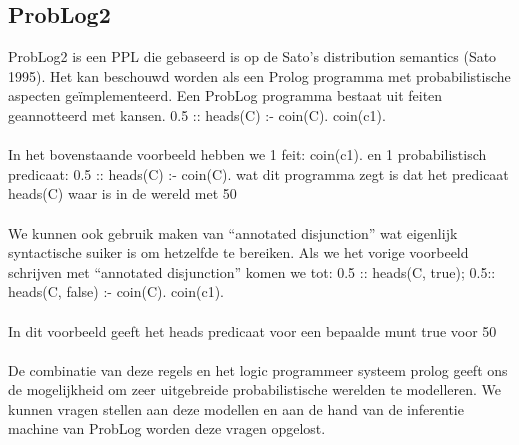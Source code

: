 \documentclass[12pt,a4paper,oneside]{book}
\begin{document}
\subsection{ProbLog2}
ProbLog2 is een PPL die gebaseerd is op de Sato’s distribution semantics (Sato 1995). Het kan beschouwd worden als een Prolog programma met probabilistische aspecten geïmplementeerd. Een ProbLog programma bestaat uit feiten geannotteerd met kansen.
0.5 :: heads(C) :- coin(C).
coin(c1).
\\\\
In het bovenstaande voorbeeld hebben we 1 feit: coin(c1). en 1 probabilistisch predicaat: 0.5 :: heads(C) :- coin(C). wat dit programma zegt is dat het predicaat heads(C) waar is in de wereld met 50%
\\\\
We kunnen ook gebruik maken van “annotated disjunction” wat eigenlijk syntactische suiker is om hetzelfde te bereiken. Als we het vorige voorbeeld schrijven met “annotated disjunction” komen we tot:
0.5 :: heads(C, true); 0.5:: heads(C, false) :- coin(C).
coin(c1).
\\\\
In dit voorbeeld geeft het heads predicaat voor een bepaalde munt true voor 50%
\\\\
De combinatie van deze regels en het logic programmeer systeem prolog geeft ons de mogelijkheid om zeer uitgebreide probabilistische werelden te modelleren. We kunnen vragen stellen aan deze modellen en aan de hand van de inferentie machine van ProbLog worden deze vragen opgelost.
\end{document}
